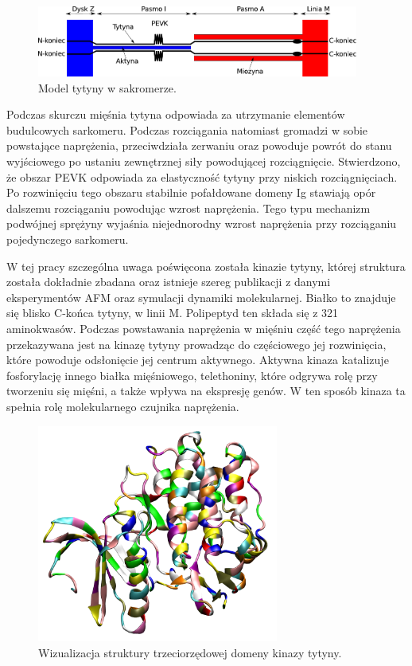 \begin{figure}[h!]
\begin{centering}
\includegraphics[width=400px]{./rys/tytyna.pdf}
\caption{Model tytyny w sakromerze.}
\end{centering}
\end{figure}

Podczas skurczu mięśnia tytyna odpowiada za utrzymanie elementów budulcowych sarkomeru. Podczas rozciągania natomiast gromadzi w sobie powstające naprężenia, przeciwdziała zerwaniu oraz powoduje powrót do stanu wyjściowego po ustaniu zewnętrznej siły powodującej rozciągnięcie. Stwierdzono, że obszar PEVK odpowiada za elastyczność tytyny przy niskich rozciągnięciach. Po rozwinięciu tego obszaru stabilnie pofałdowane domeny Ig stawiają opór dalszemu rozciąganiu powodując wzrost naprężenia. Tego typu mechanizm podwójnej sprężyny wyjaśnia niejednorodny wzrost naprężenia przy rozciąganiu pojedynczego sarkomeru.

W tej pracy szczególna uwaga poświęcona została kinazie tytyny, której struktura została dokładnie zbadana\cite{Tit_stru} oraz istnieje szereg publikacji z danymi eksperymentów AFM oraz symulacji dynamiki molekularnej\cite{mechanoenz, 1tki}. Białko to znajduje się blisko C-końca tytyny, w linii M. Polipeptyd ten składa się z 321 aminokwasów. Podczas powstawania naprężenia w mięśniu część tego naprężenia przekazywana jest na kinazę tytyny prowadząc do częściowego jej rozwinięcia, które powoduje odsłonięcie jej centrum aktywnego. Aktywna kinaza katalizuje fosforylację innego białka mięśniowego, telethoniny, które odgrywa rolę przy tworzeniu się mięśni, a także wpływa na ekspresję genów\cite{Kin_geny}. W ten sposób kinaza ta spełnia rolę molekularnego czujnika naprężenia.

\begin{figure}[h!]
\begin{centering}
\includegraphics[width=300px]{./rys/plot_tki.png}
\caption{Wizualizacja struktury trzeciorzędowej domeny kinazy tytyny.}
\end{centering}
\end{figure}

